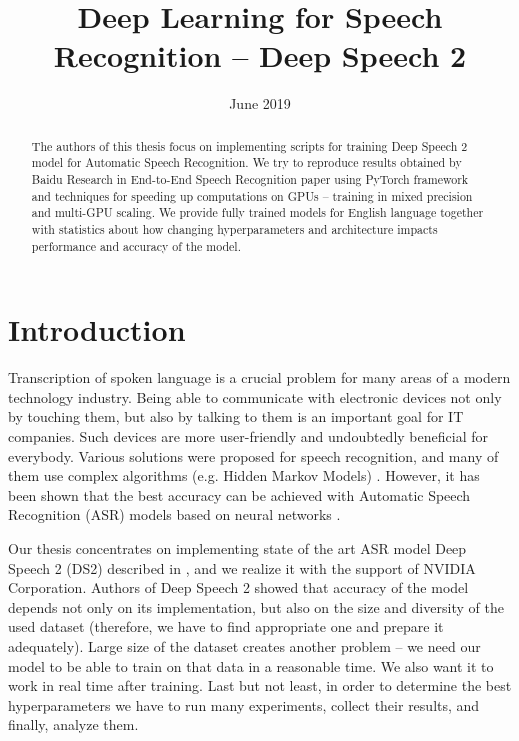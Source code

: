 \documentclass[licencjacka,en]{pracamgr}
\title{Deep Learning for Speech Recognition -- Deep Speech 2}
\date{June 2019}
\begin{document}
	\maketitle
	
	\begin{abstract}
		The authors of this thesis focus on implementing scripts for training Deep Speech 2 model for Automatic Speech Recognition. We try to reproduce results obtained by Baidu Research in End-to-End Speech Recognition paper \cite{DS2} using PyTorch framework and techniques for speeding up computations on GPUs -- training in mixed precision and multi-GPU scaling. We provide fully trained models for English language together with statistics about how changing hyperparameters and architecture impacts performance and accuracy of the model.
	\end{abstract}
	
	\tableofcontents
	
	\chapter*{Introduction}
	Transcription of spoken language is a crucial problem for many areas of a modern technology industry. Being able to communicate with electronic devices not only by touching them, but also by talking to them is an important goal for IT companies. Such devices are more user-friendly and undoubtedly beneficial for everybody. Various solutions were proposed for speech recognition, and many of them use complex algorithms (e.g. Hidden Markov Models) \cite{DS1}. However, it has been shown that the best accuracy can be achieved with Automatic Speech Recognition (ASR) models based on neural networks \cite{DS2}.
	
	Our thesis concentrates on implementing state of the art ASR model Deep Speech 2 (DS2) described in \cite{DS2}, and we realize it with the support of NVIDIA Corporation. Authors of Deep Speech 2 showed that accuracy of the model depends not only on its implementation, but also on the size and diversity of the used dataset (therefore, we have to find appropriate one and prepare it adequately). Large size of the dataset creates another problem -- we need our model to be able to train on that data in a reasonable time. We also want it to work in real time after training. Last but not least, in order to determine the best hyperparameters we have to run many experiments, collect their results, and finally, analyze them.
	
\end{document}
